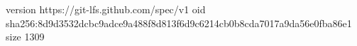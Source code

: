 version https://git-lfs.github.com/spec/v1
oid sha256:8d9d3532dcbc9adce9a488f8d813f6d9c6214cb0b8cda7017a9da56e0fba86e1
size 1309
